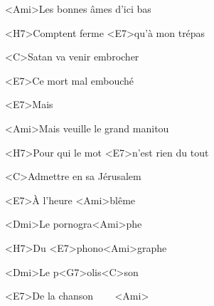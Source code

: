 \zr\kr

\zs
<Ami>Les bonnes âmes d'ici bas

<H7>Comptent ferme <E7>qu'à mon trépas

<C>Satan va venir embrocher

<E7>Ce mort mal embouché

<E7>Mais

<Ami>Mais veuille le grand manitou

<H7>Pour qui le mot <E7>n'est rien du tout

<C>Admettre en sa Jérusalem

<E7>À l'heure <Ami>blême
\ks

\zr
<Dmi>Le pornogra<Ami>phe

<H7>Du <E7>phono<Ami>graphe

<Dmi>Le p<G7>olis<C>son

<E7>De la chanson ~~~ <Ami>
\kr

\kp
